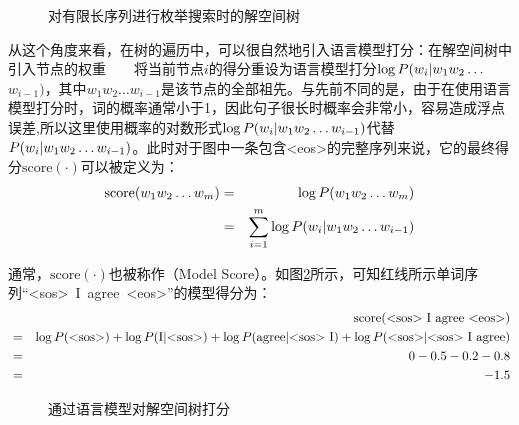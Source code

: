 \begin{figure}[htp]
    \centering
 	
	\caption{对有限长序列进行枚举搜索时的解空间树}
    \label{fig:2-14}
\end{figure}

\parinterval 从这个角度来看，在树的遍历中，可以很自然地引入语言模型打分：在解空间树中引入节点的权重\ \ \dash\ \ 将当前节点$i$的得分重设为语言模型打分$\log {P}(w_i | w_1 w_2 \ldots $\\$ w_{i-1})$，其中$w_1 w_2 \ldots w_{i-1}$是该节点的全部祖先。与先前不同的是，由于在使用语言模型打分时，词的概率通常小于1，因此句子很长时概率会非常小，容易造成浮点误差,所以这里使用概率的对数形式$\log {P}(w_i | w_1 w_2 \ldots w_{i-1})$代替${P}(w_i | w_1 w_2 \ldots w_{i-1})$。此时对于图中一条包含<eos>的完整序列来说，它的最终得分$\textrm{score}(\cdot)$可以被定义为：
\begin{eqnarray}
\textrm{score}(w_1 w_2 \ldots w_m) & = & \log {P}(w_1 w_2 \ldots w_m) \nonumber \\
                                   & = & \sum_{i=1}^{m}\log {P}(w_i | w_1 w_2 \ldots w_{i-1})
\label{eq:2-43}
\end{eqnarray}

\parinterval 通常，$\textrm{score}(\cdot)$也被称作{\small{}}（Model Score）。如图\ref{fig:2-15}所示，可知红线所示单词序列“<sos>\ I\ agree\ <eos>”的模型得分为：
\begin{eqnarray}
&&\textrm{score(<sos>\ I\ agree\ <eos>)}   \nonumber \\
& = & \log \funp{P}(\textrm{<sos>}) + \log \funp{P}(\textrm{I} | \textrm{<sos>}) + \log \funp{P}(\textrm{agree} | \textrm{<sos>\ I}) + \log \funp{P}(\textrm{<sos>}| \textrm{<sos>\ I\ agree})   \nonumber \\
& = & 0-0.5-0.2-0.8   \nonumber \\
& = & -1.5
\label{eq:2-44}
\end{eqnarray}

\begin{figure}[htp]
    \centering
 	
	\caption{通过语言模型对解空间树打分}
    \label{fig:2-15}
\end{figure}


